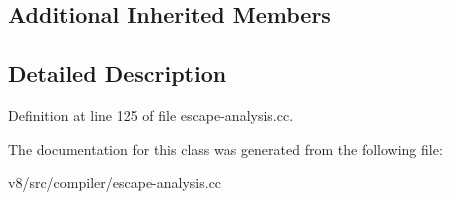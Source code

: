 \subsection*{Additional Inherited Members}


\subsection{Detailed Description}


Definition at line 125 of file escape-\/analysis.\+cc.



The documentation for this class was generated from the following file\+:\begin{DoxyCompactItemize}
\item 
v8/src/compiler/escape-\/analysis.\+cc\end{DoxyCompactItemize}
